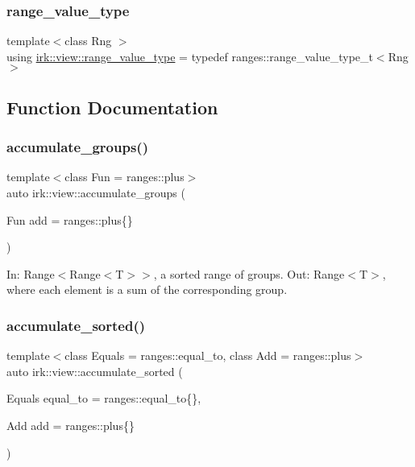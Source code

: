 \subsubsection{\texorpdfstring{range\+\_\+value\+\_\+type}{range\_value\_type}}
{\footnotesize\ttfamily template$<$class Rng $>$ \\
using \mbox{\hyperlink{namespaceirk_1_1view_af4751010e3df5f2a3c2706fe12317fbd}{irk\+::view\+::range\+\_\+value\+\_\+type}} = typedef ranges\+::range\+\_\+value\+\_\+type\+\_\+t$<$Rng$>$}



\subsection{Function Documentation}
\mbox{\label{namespaceirk_1_1view_a7e375ae6590d669795e16cfec4654eb0}} 
\subsubsection{\texorpdfstring{accumulate\+\_\+groups()}{accumulate\_groups()}}
{\footnotesize\ttfamily template$<$class Fun  = ranges\+::plus$>$ \\
auto irk\+::view\+::accumulate\+\_\+groups (\begin{DoxyParamCaption}\item[{Fun}]{add = {\ttfamily ranges\+:\+:plus\{\}} }\end{DoxyParamCaption})}

In\+: Range$<$Range$<$\+T$>$$>$, a sorted range of groups. Out\+: Range$<$\+T$>$, where each element is a sum of the corresponding group. \mbox{\label{namespaceirk_1_1view_a259c6b7d4d6f38a3de0aac91f63db2f9}} 
\subsubsection{\texorpdfstring{accumulate\+\_\+sorted()}{accumulate\_sorted()}}
{\footnotesize\ttfamily template$<$class Equals  = ranges\+::equal\+\_\+to, class Add  = ranges\+::plus$>$ \\
auto irk\+::view\+::accumulate\+\_\+sorted (\begin{DoxyParamCaption}\item[{Equals}]{equal\+\_\+to = {\ttfamily ranges\+:\+:equal\+\_\+to\{\}},  }\item[{Add}]{add = {\ttfamily ranges\+:\+:plus\{\}} }\end{DoxyParamCaption})}

